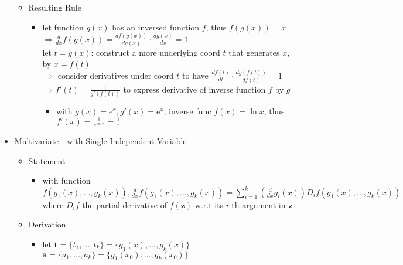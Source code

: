 \begin{itemize}
\begin{itemize}
	\item Resulting Rule
		\begin{itemize}
		\Item \begin{align*}\frac{d}{dx}\left( \frac{f(x)}{g(x)} \right) &= \frac{d}{dx} \left( f(x)\frac{1}{g(x)} \right) \\
		&= f'(x)\frac{1}{g(x)} + f(x)\frac{d}{dx}\left(\frac{1}{g(x)}\right) \\
		&= \frac{f'(x)g(x) - f(x)g'(x)}{g(x)^2} \text{, the quotient rule}\end{align*}
		\item let function $g(x)$ has an inversed function $f$, thus $f(g(x))=x$ \\
		$\Rightarrow \frac{d}{dx}f(g(x)) = \frac{df(g(x))}{dg(x)}\cdot \frac{dg(x)}{dx} = 1$ \\
		let $t=g(x)$: construct a more underlying coord $t$ that generates $x$, by $x=f(t)$ \\
		$\Rightarrow$ consider derivatives under coord $t$ to have $\frac{df(t)}{dt}\cdot \frac{dg(f(t))}{df(t)}=1$ \\
		$\Rightarrow f'(t) = \frac{1}{g'(f(t))}$ to express derivative of inverse function $f$ by $g$
			\begin{itemize}
			\item with $g(x)=\mathrm e^x, g'(x)=\mathrm e^x$, inverse func $f(x)=\ln x$, thus $f'(x)=\frac{1}{e^{\ln x}} = \frac 1 x$
			\end{itemize}
		\end{itemize}
	\end{itemize}
\item Multivariate - with Single Independent Variable
	\begin{itemize}
	\item Statement
		\begin{itemize}
		\item with function $f(g_1(x), ..., g_k(x)), \frac{d}{dx}f(g_1(x), ..., g_k(x))=\sum_{i=1}^k \left( \frac{d}{dx}g_i(x) \right)D_i f(g_1(x), ..., g_k(x))$ \\
		where $D_if$ the partial derivative of $f(\mathbf z)$ w.r.t its $i$-th argument in $\mathbf z$
		\end{itemize}
	\item Derivation
		\begin{itemize}
		\item let $\mathbf t=\{t_1,...,t_k\} = \{g_1(x), ..., g_k(x)\}$ \\
		\phantom{let} $\mathbf a = \{a_1,...,a_k\} = \{g_1(x_0), ...,g_k(x_0)\}$ \\

\end{itemize}
\end{itemize}
\end{itemize}

